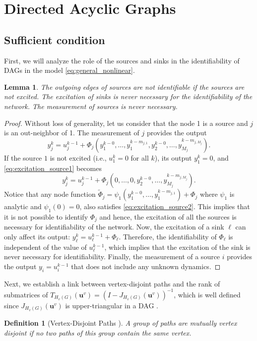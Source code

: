 \documentclass[letterpaper,10pt,journal]{IEEEtran}
\newcommand{\uu}{\mathbf{u}}
\newtheorem{definition}{Definition}
\newtheorem{lemma}{Lemma}
\begin{document}
\section{Directed Acyclic Graphs}\label{sec:DAGs}


\subsection{Sufficient condition}

First, we will analyze the role of the sources and sinks in the identifiability of DAGs in the  model \eqref{eq:general_nonlinear}. 




\begin{lemma}\label{lemma:sinks_sources}
    The outgoing edges of sources are not identifiable if the sources are not excited. The excitation of sinks is never necessary for the identifiability of the network. The measurement of sources is never necessary.
\end{lemma}
\begin{proof}
Without loss of generality, let us consider that the node 1 is a source and $j$ is an out-neighbor of 1.
    The measurement of $j$ provides the output
    \begin{equation}\label{eq:excitation_source1}
        y_j^k=u_j^{k-1}+\Phi_j(y_1^{k-0},\ldots,y_1^{k-m_{j,1}},y_2^{k-0},\ldots,y_{M_j}^{k-m_{j,M_j}}).    
    \end{equation}
    If the source $1$ is not excited (i.e., $u_1^k=0$ for all $k$), its output $y_1^k=0$, and   \eqref{eq:excitation_source1} becomes
    \begin{equation}\label{eq:excitation_source2}
        y_j^k=u_j^{k-1}+\Phi_j(0,\ldots,0,y_2^{k-0},\ldots,y_{M_j}^{k-m_{j,M_j}}).  
    \end{equation}
    Notice that any node function $\tilde \Phi_j=\psi_1(y_1^{k-0},\ldots,y_1^{k-m_{j,1}})+\Phi_j$ where $\psi_1$ is analytic and  $\psi_1(0)=0$, also satisfies \eqref{eq:excitation_source2}. This implies that it is not possible to identify $\Phi_j$ and hence, the excitation of all the sources is necessary for identifiability of the network.
    Now, the excitation of a sink $\ell$ can only affect its output:
    $y_\ell^k=u_\ell^{k-1}+\Phi_\ell$. Therefore,
    the identifiability of $\Phi_\ell$ is independent of the value of $u_\ell^{k-1}$, which implies that the excitation of the sink is never necessary for identifiability.
Finally, the measurement of a source $i$ provides the output $y_i=u_i^{k-1}$ that does not include any unknown dynamics.
\end{proof}
Next, we establish a link between vertex-disjoint paths and the rank of submatrices of $T_{H_v(G)}(\uu^v)=(I-J_{H_v(G)}(\uu^v))^{-1}$, which is well defined since $J_{H_v(G)}(\uu^v)$ is upper-triangular in a DAG \cite{hendrickx2019identifiability}.
\begin{definition}[Vertex-Disjoint Paths \cite{hendrickx2019identifiability}]
    A group of paths are mutually vertex disjoint if no two paths of this group contain the same vertex.
\end{definition}
\end{document}
